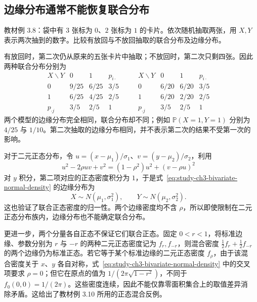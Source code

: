 \subsection{边缘分布通常不能恢复联合分布}

\begin{example}
\label{ex:study-ch3-cards-marginals}
教材例 3.8：袋中有 $3$ 张标为 $0$、$2$ 张标为 $1$ 的卡片。依次随机抽取两张，用 $X,Y$ 表示两次抽到的数字。比较有放回与不放回抽取的联合分布及边缘分布。
\end{example}

\begin{solve}
有放回时，第二次仍从原来的五张卡片中抽取；不放回时，第二次只剩四张。因此两种联合分布分别为
\[
  \begin{array}{c|cc|c}
    X\backslash Y&0&1&p_{i\cdot}\\\hline
    0&9/25&6/25&3/5\\
    1&6/25&4/25&2/5\\\hline
    p_{\cdot j}&3/5&2/5&1
  \end{array}
  \qquad
  \begin{array}{c|cc|c}
    X\backslash Y&0&1&p_{i\cdot}\\\hline
    0&6/20&6/20&3/5\\
    1&6/20&2/20&2/5\\\hline
    p_{\cdot j}&3/5&2/5&1
  \end{array}
\]
两个模型的边缘分布完全相同，联合分布却不同；例如 $\mathbb P(X=1,Y=1)$ 分别为 $4/25$ 与 $1/10$。第二次抽取的边缘分布相同，并不表示第二次的结果不受第一次的影响。
\end{solve}

对于二元正态分布，令 $u=(x-\mu_1)/\sigma_1$、$v=(y-\mu_2)/\sigma_2$，利用
\[
  u^2-2\rho uv+v^2=(1-\rho^2)u^2+(v-\rho u)^2
\]
对 $y$ 积分，第二项对应的正态密度积分为 $1$，于是式~\eqref{eq:study-ch3-bivariate-normal-density} 的边缘分布为
\begin{equation}
  X\sim N(\mu_1,\sigma_1^2),\qquad
  Y\sim N(\mu_2,\sigma_2^2).
  \label{eq:study-ch3-bivariate-normal-marginals}
\end{equation}
这也验证了联合正态密度的归一性。两个边缘密度均不含 $\rho$，所以即使限制在二元正态分布族内，边缘分布也不能确定联合分布。

更进一步，两个分量各自正态不保证它们联合正态。固定 $0<r<1$，将标准边缘、参数分别为 $r$ 与 $-r$ 的两种二元正态密度记为 $f_r,f_{-r}$，则混合密度 $\tfrac12f_r+\tfrac12f_{-r}$ 的两个边缘仍为标准正态。若它等于某个标准边缘的二元正态密度 $f_\rho$，由于该混合密度关于 $x$、$y$ 各自对称，式~\eqref{eq:study-ch3-bivariate-normal-density} 中的交叉项要求 $\rho=0$；但它在原点的值为 $1/(2\pi\sqrt{1-r^2})$，不同于 $f_0(0,0)=1/(2\pi)$。这些密度连续，因此不能仅靠零面积集合上的取值差异消除矛盾。这给出了教材例 3.10 所用的正态混合反例。

